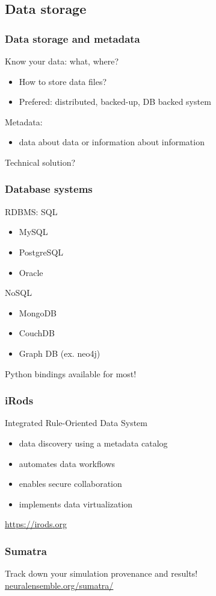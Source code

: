 \documentclass[14pt]{beamer}
\begin{document}
\subsection{Data storage}
\begin{frame}
\frametitle{Data storage and metadata}
Know your data: what, where?
\begin{itemize}
\item How to store data files?
\item Prefered: distributed, backed-up, DB backed system
\end{itemize}
Metadata:
\begin{itemize}
\item data about data or information about information
\end{itemize}
Technical solution?
\end{frame}

\begin{frame}
\frametitle{Database systems}
RDBMS: SQL
\begin{itemize}
\item MySQL
\item PostgreSQL
\item Oracle
\end{itemize}
NoSQL
\begin{itemize}
\item MongoDB
\item CouchDB
\item Graph DB (ex. neo4j)
\end{itemize}
Python bindings available for most!
\end{frame}

\begin{frame}
\frametitle{iRods}
Integrated Rule-Oriented Data System
\begin{itemize}
\item data discovery using a metadata catalog
\item automates data workflows
\item enables secure collaboration
\item implements data virtualization
\end{itemize}
\url{https://irods.org}
\end{frame}

\begin{frame}
\frametitle{Sumatra}
Track down your simulation provenance and results!\\
\url{neuralensemble.org/sumatra/}
\end{frame}
\end{document}
